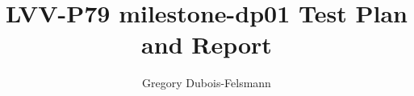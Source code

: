 \documentclass[DM,lsstdraft,toc]{lsstdoc}
\begin{document}
\def\milestoneName{milestone-dp01}
\def\milestoneId{LVV-P79}
\def\product{Data Management}


\title{LVV-P79 milestone-dp01 Test Plan and Report}
\setDocRef{\lsstDocType-\lsstDocNum}
\date{\vcsdate}
\author{Gregory Dubois-Felsmann}



\end{document}
